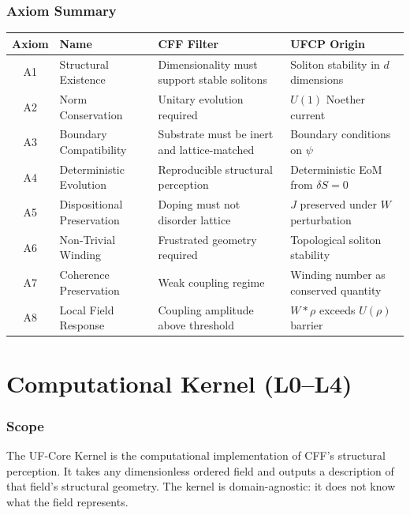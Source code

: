 \documentclass[11pt, a4paper]{article}
\begin{document}
\section{Axiom Summary}

\begin{center}
\begin{longtable}{@{}clp{5cm}p{4cm}@{}}
\toprule
\textbf{Axiom} & \textbf{Name} & \textbf{CFF Filter} &
  \textbf{UFCP Origin} \\
\midrule
\endhead
A1 & Structural Existence & Dimensionality must support
  stable solitons & Soliton stability in $d$ dimensions \\
A2 & Norm Conservation & Unitary evolution required &
  $U(1)$ Noether current \\
A3 & Boundary Compatibility & Substrate must be inert and
  lattice-matched & Boundary conditions on $\psi$ \\
A4 & Deterministic Evolution & Reproducible structural
  perception & Deterministic EoM from $\delta S = 0$ \\
A5 & Dispositional Preservation & Doping must not disorder
  lattice & $J$ preserved under $W$ perturbation \\
A6 & Non-Trivial Winding & Frustrated geometry required &
  Topological soliton stability \\
A7 & Coherence Preservation & Weak coupling regime &
  Winding number as conserved quantity \\
A8 & Local Field Response & Coupling amplitude above
  threshold & $W * \rho$ exceeds $U(\rho)$ barrier \\
\bottomrule
\end{longtable}
\end{center}

\newpage
\part{Computational Kernel (L0--L4)}

\section{Scope}

The UF-Core Kernel is the computational implementation of CFF's
structural perception. It takes any dimensionless ordered field
and outputs a description of that field's structural geometry.
The kernel is domain-agnostic: it does not know what the field
represents.
\end{document}

